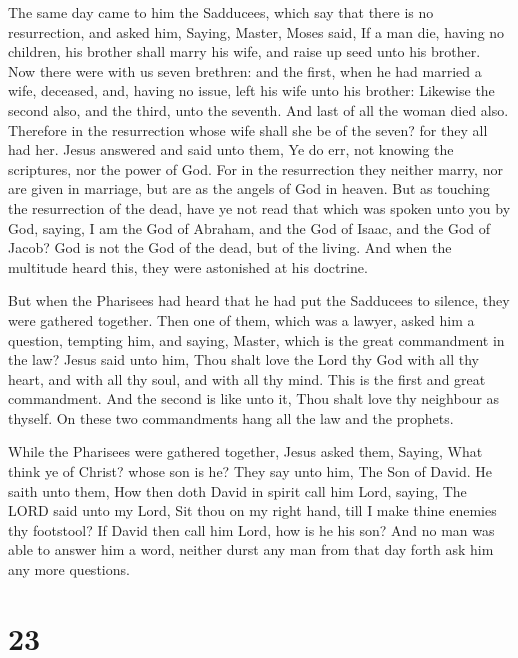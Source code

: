  The same day came to him the Sadducees, which say that
there is no resurrection, and asked him,  Saying, Master,
Moses said, If a man die, having no children, his brother shall marry
his wife, and raise up seed unto his brother.  Now there
were with us seven brethren: and the first, when he had married a wife,
deceased, and, having no issue, left his wife unto his brother:
 Likewise the second also, and the third, unto the seventh.
 And last of all the woman died also. 
Therefore in the resurrection whose wife shall she be of the seven? for
they all had her.  Jesus answered and said unto them, Ye do
err, not knowing the scriptures, nor the power of God.  For
in the resurrection they neither marry, nor are given in marriage, but
are as the angels of God in heaven.  But as touching the
resurrection of the dead, have ye not read that which was spoken unto
you by God, saying,  I am the God of Abraham, and the God
of Isaac, and the God of Jacob? God is not the God of the dead, but of
the living.  And when the multitude heard this, they were
astonished at his doctrine.

 But when the Pharisees had heard that he had put the
Sadducees to silence, they were gathered together.  Then
one of them, which was a lawyer, asked him a question, tempting him, and
saying,  Master, which is the great commandment in the law?
 Jesus said unto him, Thou shalt love the Lord thy God with
all thy heart, and with all thy soul, and with all thy mind.
 This is the first and great commandment.  And
the second is like unto it, Thou shalt love thy neighbour as thyself.
 On these two commandments hang all the law and the
prophets.

 While the Pharisees were gathered together, Jesus asked
them,  Saying, What think ye of Christ? whose son is he?
They say unto him, The Son of David.  He saith unto them,
How then doth David in spirit call him Lord, saying,  The
LORD said unto my Lord, Sit thou on my right hand, till I make thine
enemies thy footstool?  If David then call him Lord, how is
he his son?  And no man was able to answer him a word,
neither durst any man from that day forth ask him any more questions.

\hypertarget{section-22}{%
\section{23}\label{section-22}}

